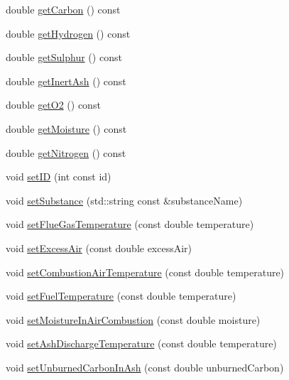 \begin{DoxyCompactItemize}
\item 
double \hyperlink{class_solid_liquid_flue_gas_material_a7b8a98111943d30094e2d6950f7f2ec1}{get\+Carbon} () const
\item 
double \hyperlink{class_solid_liquid_flue_gas_material_a26af2edd53c50b071648d03bc6442fb6}{get\+Hydrogen} () const
\item 
double \hyperlink{class_solid_liquid_flue_gas_material_abe35d8ff283bfa5aadcf00f9906025ae}{get\+Sulphur} () const
\item 
double \hyperlink{class_solid_liquid_flue_gas_material_a0549b32b7b5423267d5f59cc96b98127}{get\+Inert\+Ash} () const
\item 
double \hyperlink{class_solid_liquid_flue_gas_material_a08d588e576f605d3f9925cb649e1105e}{get\+O2} () const
\item 
double \hyperlink{class_solid_liquid_flue_gas_material_accf3c8be942d0ba244f6eabab6e7012b}{get\+Moisture} () const
\item 
double \hyperlink{class_solid_liquid_flue_gas_material_a76159a5d9d609f0e0131f7bca3b60ebc}{get\+Nitrogen} () const
\item 
void \hyperlink{class_solid_liquid_flue_gas_material_a6046d06703bd496745121b62eab4f40f}{set\+ID} (int const id)
\item 
void \hyperlink{class_solid_liquid_flue_gas_material_a54be915432c1300c4d8eaf7bf2be361f}{set\+Substance} (std\+::string const \&substance\+Name)
\item 
void \hyperlink{class_solid_liquid_flue_gas_material_ae647700dbff5ccea7938b2117f2c3156}{set\+Flue\+Gas\+Temperature} (const double temperature)
\item 
void \hyperlink{class_solid_liquid_flue_gas_material_a7a3f9f77d267afc05f5fde1da9329ec5}{set\+Excess\+Air} (const double excess\+Air)
\item 
void \hyperlink{class_solid_liquid_flue_gas_material_a626dfbc9ba87abff99e5c5a8204d69c6}{set\+Combustion\+Air\+Temperature} (const double temperature)
\item 
void \hyperlink{class_solid_liquid_flue_gas_material_a420ba1234c5f8c4b93f190b61046a589}{set\+Fuel\+Temperature} (const double temperature)
\item 
void \hyperlink{class_solid_liquid_flue_gas_material_a1a5f1bd3008e78cce62edb8aca642284}{set\+Moisture\+In\+Air\+Combustion} (const double moisture)
\item 
void \hyperlink{class_solid_liquid_flue_gas_material_ad29543a88737c3d051c7d824287bc791}{set\+Ash\+Discharge\+Temperature} (const double temperature)
\item 
void \hyperlink{class_solid_liquid_flue_gas_material_adf052dd1bdceeab710a4986b1fd874b9}{set\+Unburned\+Carbon\+In\+Ash} (const double unburned\+Carbon)
\end{DoxyCompactItemize}
